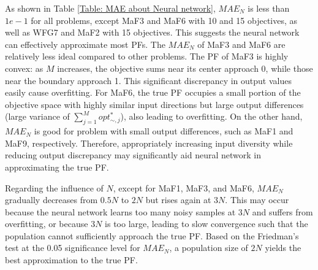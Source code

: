 \documentclass[a4paper,fleqn]{cas-dc}
\begin{document}
\begin{sloppypar}
	
	\par{As shown in Table \ref{Table: MAE about Neural network}, $MAE_N$ is less than $1e-1$ for all problems, except  MaF3 and MaF6 with 10 and 15 objectives, as well as WFG7 and MaF2 with 15 objectives. This suggests the neural network can  effectively approximate most PFs. The $MAE_N$  of MaF3 and MaF6 are relatively less ideal compared to other problems. The PF of MaF3 is highly convex: as $M$ increases, the objective sums near its center approach 0, while those near the boundary approach 1. This significant discrepancy in output values easily cause overfitting. For MaF6, the true PF occupies a small portion of the objective space with highly similar input directions but large output differences (large variance of $\sum_{j=1}^{M}{opt^\ast_{\sim,j}}$), also leading to overfitting.} {On the other hand, $MAE_N$ is  good for problem  with small output differences, such as MaF1 and MaF9, respectively. Therefore, appropriately increasing input diversity while reducing output discrepancy may significantly aid neural network in approximating the true PF.} 
	\par {Regarding the influence of $N$, except for MaF1, MaF3, and MaF6, $MAE_N$  gradually decreases from $0.5N$ to $2N$ but rises again at $3N$. This may occur because the neural network learns too many noisy samples at $3N$ and suffers from overfitting, or because $3N$ is too large, leading to slow convergence such that the population cannot sufficiently approach the true PF. Based on the Friedman's test \cite{Friedman} at the 0.05 significance level  for $MAE_N$, a population size of $2N$ yields the best approximation to the true PF.}
	
	\begin{table}[ht]
		\centering
		\caption{ {$MAE_N$ used to analyze network fitting ability for different population size $N$}}\label{Table: MAE about Neural network}
\end{table}
\end{sloppypar}
\end{document}
